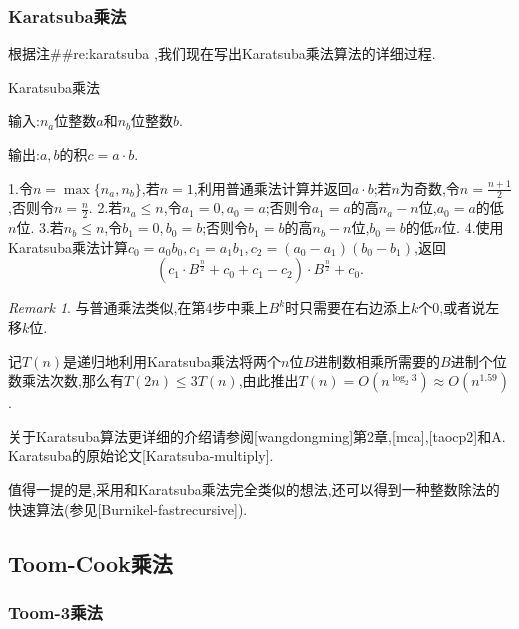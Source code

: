 \documentclass{ctexart}
\newcommand\mtcasCite[1]{[#1]}
\theoremstyle{remark}
\newtheorem{remark}{Remark}
\theoremstyle{definition}
\begin{document}
\subsubsection{Karatsuba乘法}

根据注##re:karatsuba ,我们现在写出Karatsuba乘法算法的详细过程.
\begin{algorithm}{Karatsuba乘法}\label{al:karatsuba}

输入:$n_a$位整数$a$和$n_b$位整数$b$.

输出:$a,b$的积$c=a\cdot b$.

 1.令$n=\max\{n_a,n_b\}$,若$n=1$,利用普通乘法计算并返回$a\cdot b$;若$n$为奇数,令$n=\frac{n+1}{2}$,否则令$n=\frac{n}{2}$.
 2.若$n_a\le n$,令$a_1=0,a_0=a$;否则令$a_1=a$的高$n_a-n$位,$a_0=a$的低$n$位.
 3.若$n_b\le n$,令$b_1=0,b_0=b$;否则令$b_1=b$的高$n_b-n$位,$b_0=b$的低$n$位. 
 4.使用Karatsuba乘法计算$c_0=a_0b_0,c_1=a_1b_1,c_2=(a_0-a_1)(b_0-b_1)$,返回$$(c_1\cdot B^{\frac{n}{2}}+c_0+c_1-c_2)\cdot B^{\frac{n}{2}}+c_0.$$
\end{algorithm}
\begin{remark}
与普通乘法类似,在第4步中乘上$B^k$时只需要在右边添上$k$个0,或者说左移$k$位.
\end{remark}
记$T(n)$是递归地利用Karatsuba乘法将两个$n$位$B$进制数相乘所需要的$B$进制个位数乘法次数,那么有$T(2n)\le 3T(n)$,由此推出$T(n)=O(n^{\log_2{3}})\approx O(n^{1.59})$.

关于Karatsuba算法更详细的介绍请参阅\mtcasCite{wangdongming}第2章,\mtcasCite{mca},\mtcasCite{taocp2}和A. Karatsuba的原始论文\mtcasCite{Karatsuba-multiply}.

值得一提的是,采用和Karatsuba乘法完全类似的想法,还可以得到一种整数除法的快速算法(参见\mtcasCite{Burnikel-fastrecursive}).

\subsection{Toom-Cook乘法}

\subsubsection{Toom-3乘法}
\end{document}
